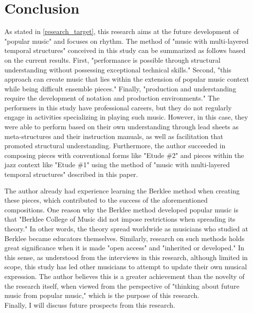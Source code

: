\section{Conclusion}

As stated in \ref{research_target}, this research aims at the future development of "popular music" and focuses on rhythm. The method of "music with multi-layered temporal structures" conceived in this study can be summarized as follows based on the current results. First, "performance is possible through structural understanding without possessing exceptional technical skills." Second, "this approach can create music that lies within the extension of popular music context while being difficult ensemble pieces." Finally, "production and understanding require the development of notation and production environments." The performers in this study have professional careers, but they do not regularly engage in activities specializing in playing such music. However, in this case, they were able to perform based on their own understanding through lead sheets as meta-structures and their instruction manuals, as well as facilitation that promoted structural understanding. Furthermore, the author succeeded in composing pieces with conventional forms like "Etude \#2" and pieces within the jazz context like "Etude \#1" using the method of "music with multi-layered temporal structures" described in this paper.

The author already had experience learning the Berklee method when creating these pieces, which contributed to the success of the aforementioned compositions. One reason why the Berklee method developed popular music is that "Berklee College of Music did not impose restrictions when spreading its theory." In other words, the theory spread worldwide as musicians who studied at Berklee became educators themselves. Similarly, research on such methods holds great significance when it is made "open access" and "inherited or developed." In this sense, as understood from the interviews in this research, although limited in scope, this study has led other musicians to attempt to update their own musical expression. The author believes this is a greater achievement than the novelty of the research itself, when viewed from the perspective of "thinking about future music from popular music," which is the purpose of this research.\\

Finally, I will discuss future prospects from this research.\\


